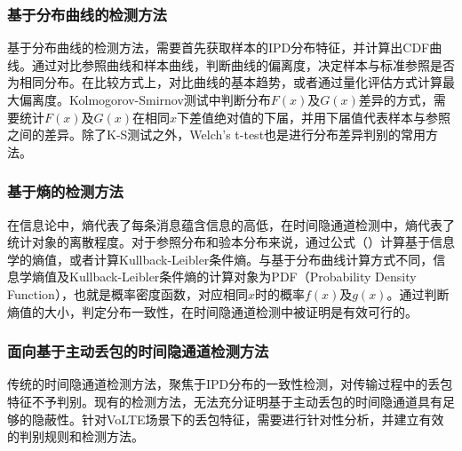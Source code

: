\subsubsection{基于分布曲线的检测方法}
基于分布曲线的检测方法，需要首先获取样本的IPD分布特征，并计算出CDF曲线。通过对比参照曲线和样本曲线，判断曲线的偏离度，决定样本与标准参照是否为相同分布。在比较方式上，对比曲线的基本趋势，或者通过量化评估方式计算最大偏离度。Kolmogorov-Smirnov测试中判断分布$F(x)$及$G(x)$差异的方式，需要统计$F(x)$及$G(x)$在相同$x$下差值绝对值的下届，并用下届值代表样本与参照之间的差异。除了K-S测试之外，Welch’s t-test也是进行分布差异判别的常用方法。


\subsubsection{基于熵的检测方法}
在信息论中，熵代表了每条消息蕴含信息的高低，在时间隐通道检测中，熵代表了统计对象的离散程度。对于参照分布和验本分布来说，通过公式（）计算基于信息学的熵值，或者计算Kullback-Leibler条件熵。与基于分布曲线计算方式不同，信息学熵值及Kullback-Leibler条件熵的计算对象为PDF（Probability Density Function），也就是概率密度函数，对应相同$x$时的概率$f(x)$及$g(x)$。通过判断熵值的大小，判定分布一致性，在时间隐通道检测中被证明是有效可行的。

\subsubsection{面向基于主动丢包的时间隐通道检测方法}
传统的时间隐通道检测方法，聚焦于IPD分布的一致性检测，对传输过程中的丢包特征不予判别。现有的检测方法，无法充分证明基于主动丢包的时间隐通道具有足够的隐蔽性。针对VoLTE场景下的丢包特征，需要进行针对性分析，并建立有效的判别规则和检测方法。

